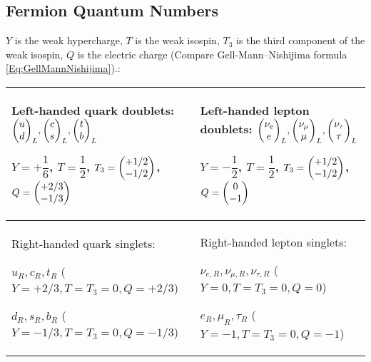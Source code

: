 		\newpage
	\subsection{Fermion Quantum Numbers}
		\label{Sec:FermionConstants}
		$Y$ is the weak hypercharge, $T$ is the weak isospin, $T_3$ is the third component of the weak isospin, $Q$ is the electric charge (Compare Gell-Mann--Nishijima formula \ref{Eq:GellMannNishijima}).:
		\begin{center}
			\begin{tabular}{| L{.46\textwidth} | L{.46\textwidth} |}
				\hline
				Left-handed quark doublets:
				$\doublet{u}{d}_L, \doublet{c}{s}_L, \doublet{t}{b}_L$

				$Y=+\dfrac{1}{6}$, $T=\dfrac{1}{2}$,
				$T_3=\doublet{+1/2}{-1/2}$, $Q=\doublet{+2/3}{-1/3}$
				&
				Left-handed lepton doublets: $\doublet{\nu_e}{e}_L, \doublet{\nu_\mu}{\mu}_L, \doublet{\nu_\tau}{\tau}_L$

				$Y=-\dfrac{1}{2}$, $T=\dfrac{1}{2}$,
				$T_3=\doublet{+1/2}{-1/2}$, $Q=\doublet{0}{-1}$
				\\
				\hline
				Right-handed quark singlets:

				$u_R,c_R,t_R$ ($Y=+2/3, T=T_3=0, Q=+2/3$)

				$d_R,s_R,b_R$ ($Y=-1/3, T=T_3=0, Q=-1/3$)
				&
				Right-handed lepton singlets:

				$\nu_{e,R}, \nu_{\mu,R}, \nu_{\tau,R}$ ($Y=0, T=T_3=0, Q=0$)

				$e_R, \mu_R, \tau_R$ ($Y=-1, T=T_3=0, Q=-1$)
				\\
				\hline
			\end{tabular}
		\end{center}

		\renewcommand{\arraystretch}{2.0}
